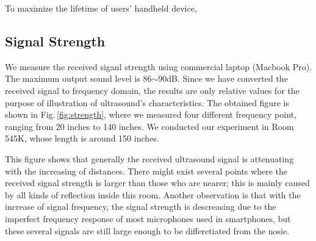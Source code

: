 To maximize the lifetime of users' handheld device, 


\subsection{Signal Strength}
\label{sec:signal-strength}
We measure the received siganl strength using commercial laptop (Macbook Pro). The maximum output sound level is 86$\sim$90dB. Since we have converted the received signal to frequency domain, the results are only relative values for the purpose of illustration of ultrasound's characteristics. The obtained figure is shown in Fig.\,\ref{fig:strength}, where we measured four different frequency point, ranging from 20 inches to 140 inches. We conducted our experiment in Room 545K, whose length is around 150 inches. 

This figure shows that generally the received ultrasound signal is attenuating with the increasing of distances. There might exist several points where the received signal strength is larger than those who are nearer; this is mainly caused by all kinds of reflection inside this room. Another observation is that with the increase of signal frequency, the signal strength is descreasing due to the imperfect frequency response of most microphones used in smartphones, but these several signals are still large enough to be differetiated from the nosie.

